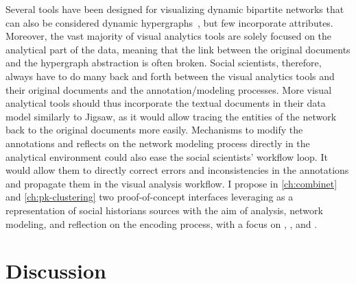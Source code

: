Several tools have been designed for visualizing dynamic bipartite networks that can also be considered dynamic hypergraphs~\cite{valdiviaAnalyzingDynamicHypergraphs2021, hyperstorylines}, but few incorporate attributes.
Moreover, the vast majority of visual analytics tools are solely focused on the analytical part of the data, meaning that the link between the original documents and the hypergraph abstraction is often broken.
Social scientists, therefore, always have to do many back and forth between the visual analytics tools and their original documents and the annotation/modeling processes.
More visual analytical tools should thus incorporate the textual documents in their data model similarly to Jigsaw\cite{staskoJigsawSupportingInvestigative2008}, as it would allow tracing the entities of the network back to the original documents more easily.
Mechanisms to modify the annotations and reflects on the network modeling process directly in the analytical environment could also ease the social scientists' workflow loop.
It would allow them to directly correct errors and inconsistencies in the annotations and propagate them in the visual analysis workflow.
I propose in \autoref{ch:combinet} and \autoref{ch:pk-clustering} two proof-of-concept interfaces leveraging \modelplural as a representation of social historians sources with the aim of analysis, network modeling, and reflection on the encoding process, with a focus on \traceability, \reality, and \simplicity.


\section{Discussion}


